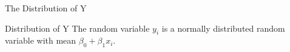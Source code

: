 \begin{frame}{The Distribution of Y}

  \begin{block}{Distribution of Y}
    The random variable $y_i$ is a normally distributed random
    variable with mean $\beta_0+\beta_1x_i$.
  \end{block}




  
\end{frame}

